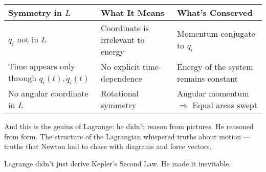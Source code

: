 \vspace{0.5em}

\begin{center}
    \renewcommand{\arraystretch}{1.5}
    \begin{tabularx}{\textwidth}{|l|X|X|}
    \hline
    \textbf{Symmetry in \( L \)} & \textbf{What It Means} & \textbf{What’s Conserved} \\ \hline
    \( q_i \) not in \( L \) & Coordinate is irrelevant to energy & Momentum conjugate to \( q_i \) \\ \hline
    Time appears only through \( q_i(t), \dot{q}_i(t) \) & No explicit time-dependence & Energy of the system remains constant \\ \hline
    No angular coordinate in \( L \) & Rotational symmetry & Angular momentum $\Rightarrow$ Equal areas swept \\ \hline
    \end{tabularx}
\end{center}

\vspace{1em}

And this is the genius of Lagrange: he didn’t reason from pictures. He reasoned from form. The structure of the Lagrangian whispered truths about motion — truths that Newton had to chase with diagrams and force vectors.

Lagrange didn’t just derive Kepler’s Second Law. He made it inevitable.
